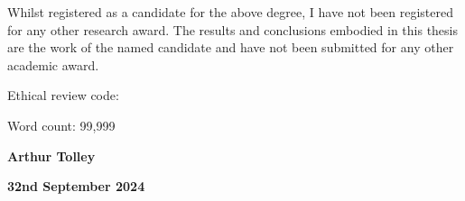 Whilst registered as a candidate for the above degree, I have not been registered for any other research award. The results and conclusions embodied in this thesis are the work of the named candidate and have not been submitted for any other academic award.

\vspace{\baselineskip}
\noindent Ethical review code: 

\vspace{\baselineskip}
\noindent Word count:   99,999

\noindent\hrulefill

\vspace{\baselineskip}
\noindent \textbf{Arthur Tolley}

\noindent \textbf{32nd September 2024}